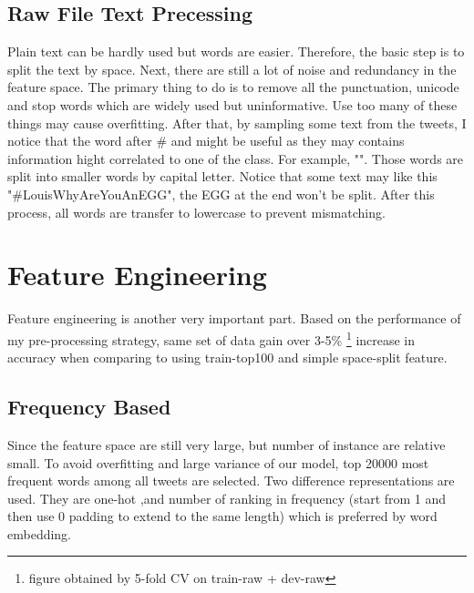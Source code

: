 \documentclass[11pt]{article}
\begin{document}
\subsection{Raw File Text Precessing}
Plain text can be hardly used but words are easier. 
Therefore, the basic step is to split the text by space. Next, 
there are still a lot of noise and redundancy in the feature space.
The primary thing to do is to remove all the punctuation, unicode and stop words which are widely 
used but uninformative. Use too many of these things may cause overfitting.
After that, by sampling some text from the tweets, I notice that the word after
\# and \@ might be useful as they may contains information
hight correlated to one of the class. 
For example, "". Those words are split into smaller words by capital letter. 
Notice that some text may like this "\#LouisWhyAreYouAnEGG", the EGG at the
end won't be split. After this process, all words are transfer to lowercase to prevent mismatching.

\section{Feature Engineering}
Feature engineering is another very important part.
Based on the performance of my pre-processing strategy, 
same set of data gain over 3-5\% 
\footnote{figure obtained by 5-fold CV on train-raw + dev-raw}
increase in accuracy when comparing to using train-top100 and simple space-split feature.

\subsection{Frequency Based}
Since the feature space are still very large, but number of instance
are relative small. To avoid overfitting and large variance of our model, 
top 20000 most frequent words among all tweets are selected. 
Two difference representations are used. They are one-hot ,and number 
of ranking in frequency (start from 1 and then use 0 padding to extend to the same length) which is preferred 
by word embedding.
\end{document}
